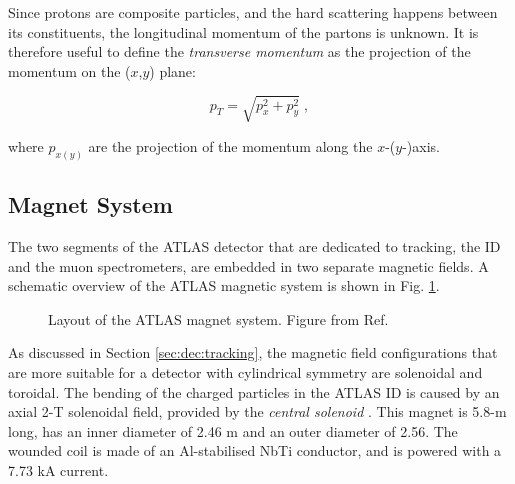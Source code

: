 Since protons are composite particles, and the hard scattering happens between its constituents, the longitudinal momentum of the partons is unknown. It is therefore useful to define the \textit{transverse momentum} as the projection of the momentum on the ($x$,$y$) plane: 

\begin{equation}
\label{eq:cern:pt}
p_T = \sqrt{p_x^2 + p_y^2} \; ,
\end{equation}

where $p_{x(y)}$ are the projection of the momentum along the $x$-($y$-)axis.




\subsection{Magnet System}
\label{sec:atlas:magnets}

The two segments of the ATLAS detector that are dedicated to tracking, the ID and the muon spectrometers, are embedded in two separate magnetic fields. A schematic overview of the ATLAS magnetic system is shown in Fig. \ref{fig:atlas:magnet}.
\label{sec:cern:atlasmagnets}
\begin{figure}[ht]
\centering
{}
\caption{Layout of the ATLAS magnet system. Figure from Ref. \cite{Goodson}}
\label{fig:atlas:magnet}
\end{figure}

As discussed in Section \ref{sec:dec:tracking}, the magnetic field configurations that are more suitable for a detector with cylindrical symmetry are solenoidal and toroidal. The bending of the charged particles in the ATLAS ID is caused by an axial 2-T solenoidal field, provided by the \textit{central solenoid} \cite{YAMAMOTO200853}. This magnet is 5.8-m long, has an inner diameter of 2.46 m and an outer diameter of 2.56. The wounded coil is made of an Al-stabilised NbTi conductor, and is powered with a 7.73 kA current. 


